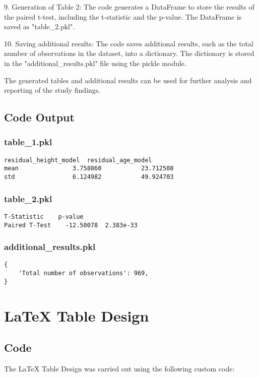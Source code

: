 \documentclass[11pt]{article}
\begin{document}
9. Generation of Table 2: The code generates a DataFrame to store the results of the paired t-test, including the t-statistic and the p-value. The DataFrame is saved as "table\_2.pkl".

10. Saving additional results: The code saves additional results, such as the total number of observations in the dataset, into a dictionary. The dictionary is stored in the "additional\_results.pkl" file using the pickle module.

The generated tables and additional results can be used for further analysis and reporting of the study findings.

\subsection{Code Output}

\subsubsection*{table\_1.pkl}

\begin{Verbatim}[tabsize=4]
      residual_height_model  residual_age_model
mean               3.758860           23.712508
std                6.124982           49.924703
\end{Verbatim}

\subsubsection*{table\_2.pkl}

\begin{Verbatim}[tabsize=4]
               T-Statistic    p-value
Paired T-Test    -12.50078  2.383e-33
\end{Verbatim}

\subsubsection*{additional\_results.pkl}

\begin{Verbatim}[tabsize=4]
{
    'Total number of observations': 969,
}
\end{Verbatim}

\section{LaTeX Table Design}
\subsection{{Code}}
The LaTeX Table Design was carried out using the following custom code:
\end{document}

